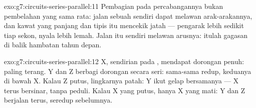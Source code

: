 \begin{solution}{exo:g7:circuits-series-parallel:11}
Pembagian pada percabangannya bukan pembelahan yang sama rata: jalan
sebuah  sendiri dapat melawan arak-arakannya, dan kawat yang
panjang dan tipis itu mencekik jatah  --- pengarak lebih
sedikit tiap sekon, nyala lebih lemah. Jalan itu sendiri melawan
arusnya: itulah gagasan di balik hambatan tahun depan.
\end{solution}

\begin{solution}{exo:g7:circuits-series-parallel:12}
X, sendirian pada , mendapat dorongan penuh: paling terang. Y
dan Z berbagi dorongan  secara seri: sama-sama redup,
keduanya di bawah X. Kalau Z putus, lingkarnya patah: Y ikut gelap
bersamanya --- X terus bersinar, tanpa peduli. Kalau X yang putus,
hanya  X yang mati: Y dan Z berjalan terus, seredup sebelumnya.
\end{solution}

